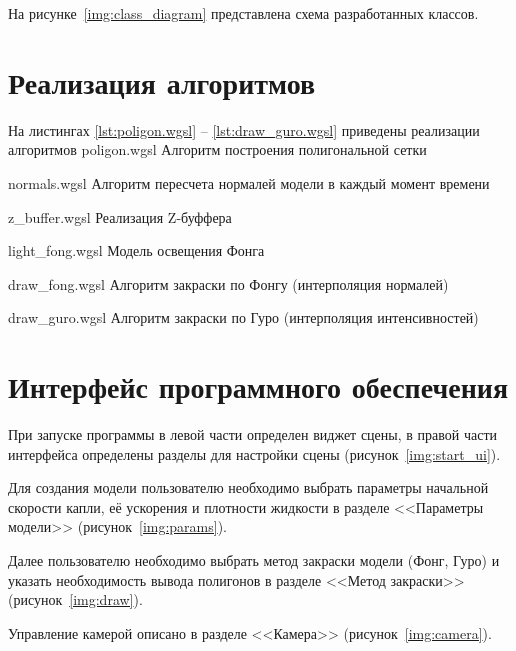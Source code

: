 На рисунке~\ref{img:class_diagram} представлена схема разработанных классов.



\section{Реализация алгоритмов}
На листингах \ref{lst:poligon.wgsl} -- \ref{lst:draw_guro.wgsl} приведены реализации алгоритмов
\newpage
{}
    {poligon.wgsl}
    {Алгоритм построения полигональной сетки}

\newpage

    {normals.wgsl}
    {Алгоритм пересчета нормалей модели в каждый момент времени}

\newpage

    {z_buffer.wgsl}
    {Реализация Z-буффера}

    {light_fong.wgsl}
    {Модель освещения Фонга}

\newpage

    {draw_fong.wgsl}
    {Алгоритм закраски по Фонгу (интерполяция нормалей)}

\newpage
    {draw_guro.wgsl}
    {Алгоритм закраски по Гуро (интерполяция интенсивностей)}

\newpage

\section{Интерфейс программного обеспечения}

При запуске программы в левой части определен виджет сцены, 
в правой части интерфейса определены разделы для настройки сцены (рисунок~\ref{img:start_ui}).

\newpage

Для создания модели пользователю необходимо выбрать параметры начальной скорости капли, её ускорения и плотности жидкости в разделе <<Параметры модели>> (рисунок~\ref{img:params}).

Далее пользователю необходимо выбрать метод закраски модели (Фонг, Гуро) и указать необходимость вывода полигонов в разделе <<Метод закраски>> (рисунок~\ref{img:draw}).

Управление камерой описано в разделе <<Камера>> (рисунок~\ref{img:camera}).

